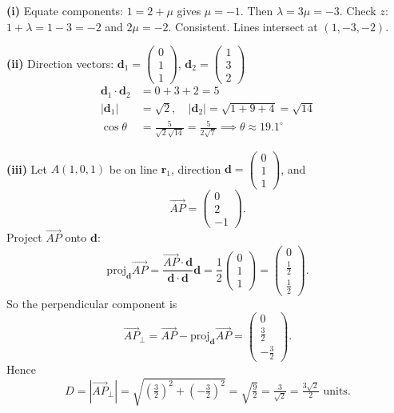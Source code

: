\begin{solution}
\textbf{(i)} Equate components: $1 = 2 + \mu$ gives $\mu = -1$. Then $\lambda = 3\mu = -3$. Check $z$: $1 + \lambda = 1 - 3 = -2$ and $2\mu = -2$. Consistent. Lines intersect at $(1, -3, -2)$.

\textbf{(ii)} Direction vectors: $\mathbf{d}_1 = \begin{pmatrix} 0 \\ 1 \\ 1 \end{pmatrix}$, $\mathbf{d}_2 = \begin{pmatrix} 1 \\ 3 \\ 2 \end{pmatrix}$
\vspace{-2mm}
\begin{align*}
\mathbf{d}_1 \cdot \mathbf{d}_2 &= 0 + 3 + 2 = 5\\
|\mathbf{d}_1| &= \sqrt{2}, \quad |\mathbf{d}_2| = \sqrt{1+9+4} = \sqrt{14}\\
\cos\theta &= \tfrac{5}{\sqrt{2}\sqrt{14}} = \tfrac{5}{2\sqrt{7}} \implies \theta \approx 19.1^\circ
\end{align*}

\textbf{(iii)} Let $A(1,0,1)$ be on line $\mathbf{r}_1$, direction $\mathbf{d} = \begin{pmatrix} 0 \\ 1 \\ 1 \end{pmatrix}$, and
\[
\vec{AP} = \begin{pmatrix} 0 \\ 2 \\ -1 \end{pmatrix}.
\]
Project $\vec{AP}$ onto $\mathbf{d}$:
\[
\text{proj}_{\mathbf{d}}\vec{AP}
= \frac{\vec{AP} \cdot \mathbf{d}}{\mathbf{d} \cdot \mathbf{d}}\mathbf{d}
= \frac{1}{2}\begin{pmatrix} 0 \\ 1 \\ 1 \end{pmatrix}
= \begin{pmatrix} 0 \\ \tfrac{1}{2} \\ \tfrac{1}{2} \end{pmatrix}.
\]
So the perpendicular component is
\[
\vec{AP}_{\perp}
= \vec{AP} - \text{proj}_{\mathbf{d}}\vec{AP}
= \begin{pmatrix} 0 \\ \tfrac{3}{2} \\ -\tfrac{3}{2} \end{pmatrix}.
\]
Hence
\[
D = |\vec{AP}_{\perp}| = \sqrt{\left(\tfrac{3}{2}\right)^2 + \left(-\tfrac{3}{2}\right)^2}
= \sqrt{\tfrac{9}{2}} = \tfrac{3}{\sqrt{2}} = \tfrac{3\sqrt{2}}{2} \text{ units}.
\]
\end{solution}

